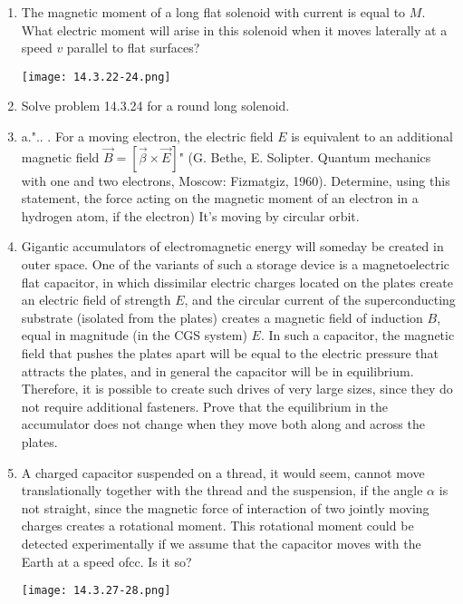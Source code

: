 \documentclass{article}
\begin{document}
\begin{enumerate}[label=14.3.\arabic*]
\item The magnetic moment of a long flat solenoid with current is equal to $M$. What electric moment will arise in this solenoid when it moves laterally at a speed $v$ parallel to flat surfaces?

\begin{center}
    \texttt{[image: 14.3.22-24.png]}
\end{center}

\item Solve problem 14.3.24 for a round long solenoid.

\item a.".. . For a moving electron, the electric field $E$ is equivalent to an additional magnetic field $ \overrightarrow{B} = [\overrightarrow{\beta} \times \overrightarrow{E} ]$" (G. Bethe, E. Solipter. Quantum mechanics with one and two electrons, Moscow: Fizmatgiz, 1960). Determine, using this statement, the force acting on the magnetic moment of an electron in a hydrogen atom, if the electron) It's moving by circular orbit.

\item Gigantic accumulators of electromagnetic energy will someday be created in outer space. One of the variants of such a storage device is a magnetoelectric flat capacitor, in which dissimilar electric charges located on the plates create an electric field of strength $E$, and the circular current of the superconducting substrate (isolated from the plates) creates a magnetic field of induction $B$, equal in magnitude (in the CGS system) $E$. In such a capacitor, the magnetic field that pushes the plates apart will be equal to the electric pressure that attracts the plates, and in general the capacitor will be in equilibrium. Therefore, it is possible to create such drives of very large sizes, since they do not require additional fasteners. Prove that the equilibrium in the accumulator does not change when they move both along and across the plates.

\item A charged capacitor suspended on a thread, it would seem, cannot move translationally together with the thread and the suspension, if the angle $\alpha$ is not straight, since the magnetic force of interaction of two jointly moving charges creates a rotational moment. This rotational moment could be detected experimentally if we assume that the capacitor moves with the Earth at a speed ofcc. Is it so?

\begin{center}
    \texttt{[image: 14.3.27-28.png]}
\end{center}


\end{enumerate}
\end{document}

